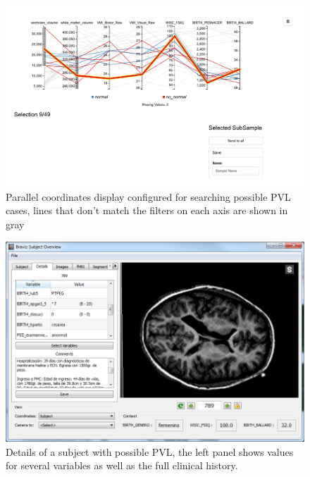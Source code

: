 \documentclass{frontiersHLTH}
\begin{document}
\begin{figure}
\begin{center}
\includegraphics[width=\linewidth,trim = 30mm 90mm 60mm 10mm ,clip]{parallel_coordinates_raw}
\end{center}
 \caption{\label{fig_parallel}Parallel coordinates display configured for searching possible PVL cases, lines that don't match the filters on each axis are shown in gray}
\end{figure}


\begin{figure}
\begin{center}
\includegraphics[width=\linewidth]{pvl_details}
\end{center}
 \caption{\label{fig_subject3}Details of a subject with possible PVL, the left panel shows values for several variables as well as the full clinical history.}
\end{figure}
\end{document}
